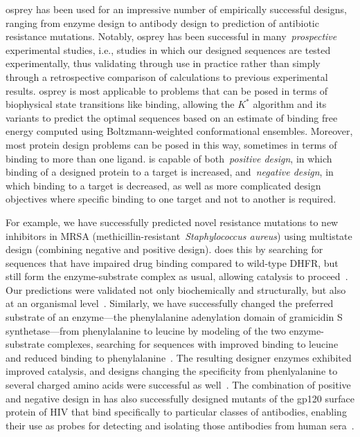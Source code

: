 
{\sc osprey} has been used for an impressive number of empirically successful designs, ranging from enzyme design to antibody design to prediction of antibiotic resistance mutations.  Notably, {\sc osprey} has been successful in many~\textit{prospective} experimental studies, i.e., studies in which our designed sequences are tested experimentally, thus validating \osprey through use in practice rather than simply through a retrospective comparison of \osprey calculations to previous experimental results.  {\sc osprey} is most applicable to problems that can be posed in terms of biophysical state transitions like binding, allowing the $K^*$ algorithm and its variants to predict the optimal sequences based on an estimate of binding free energy computed using Boltzmann-weighted conformational ensembles.  Moreover, most protein design problems can be posed in this way, sometimes in terms of binding to more than one ligand.  \osprey is capable of both~\textit{positive design}, in which binding of a designed protein to a target is increased, and~\textit{negative design}, in which binding to a target is decreased, as well as more complicated design objectives where specific binding to one target and not to another is required.  

For example, we have successfully predicted novel resistance mutations to new inhibitors in MRSA (methicillin-resistant~\textit{Staphylococcus aureus}) using multistate design (combining negative and positive design).  \osprey does this by searching for sequences that have impaired drug binding compared to wild-type DHFR, but still form the enzyme-substrate complex as usual, allowing catalysis to proceed~\cite{DHFR-PNAS,DHFR-PNAS2}.  Our predictions were validated not only biochemically and structurally, but also at an organismal level~\cite{DHFR-PNAS2, mimb_resistance}.  Similarly, we have successfully changed the preferred substrate of an enzyme---the phenylalanine adenylation domain of gramicidin S synthetase---from phenylalanine to leucine by modeling of the two enzyme-substrate complexes, searching for sequences with improved binding to leucine and reduced binding to phenylalanine~\cite{GrsA-LeuA}.  The resulting designer enzymes exhibited improved catalysis, and designs changing the specificity from phenlyalanine to several charged amino acids were successful as well~\cite{GrsA-LeuA}.  The combination of positive and negative design in \osprey has also successfully designed mutants of the gp120 surface protein of HIV that bind specifically to particular classes of antibodies, enabling their use as probes for detecting and isolating those antibodies from human sera~\cite{specific_probes}.  


